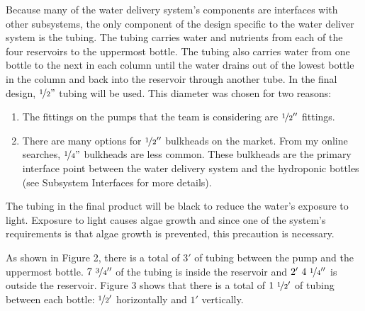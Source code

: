 \documentclass[12pt]{article}
\begin{document}
Because many of the water delivery system's components are interfaces with other subsystems, the
only component of the design specific to the water deliver system is the tubing. The tubing carries
water and nutrients from each of the four reservoirs to the uppermost bottle. The tubing also
carries water from one bottle to the next in each column until the water drains out of the lowest
bottle in the column and back into the reservoir through another tube. In the final design,
$\nicefrac{1}{2}"$ tubing will be used. This diameter was chosen for two reasons:

\begin{enumerate}

    \item The fittings on the pumps that the team is considering are $\nicefrac{1}{2}''$ fittings.

    \item There are many options for $\nicefrac{1}{2}''$ bulkheads on the market. From my online
        searches, $\nicefrac{1}{4}"$ bulkheads are less common. These bulkheads are the primary
        interface point between the water delivery system and the hydroponic bottles (see Subsystem
        Interfaces for more details).

\end{enumerate}


The tubing in the final product will be black to reduce the water's exposure to light. Exposure to
light causes algae growth \cite{doe-washington} and since one of the system's requirements is that
algae growth is prevented, this precaution is necessary.

As shown in Figure 2, there is a total of $3'$ of tubing between the pump and the uppermost bottle.
$7\ \nicefrac{3}{4}''$ of the tubing is inside the reservoir and $2'\ 4\ \nicefrac{1}{4}''$ is
outside the reservoir. Figure 3 shows that there is a total of $1\ \nicefrac{1}{2}'$ of tubing
between each bottle: $\nicefrac{1}{2}'$ horizontally and $1'$ vertically.
\end{document}
